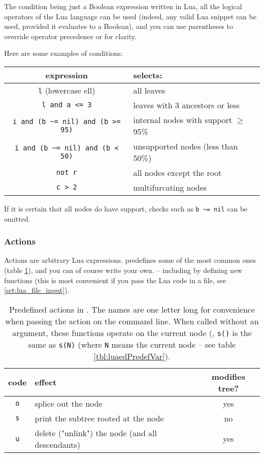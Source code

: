 The condition being just a Boolean expression written in Lua, all the logical
operators of the Lua language can be used (indeed, any valid Lua snippet can be
used, provided it evaluates to a Boolean), and you can use parentheses to
override operator precedence or for clarity.

\noindent{}Here are some examples of \luaed{} conditions:

\begin{center}
\begin{tabular}{cl}
expression & selects: \\
\hline
\texttt{l} (lowercase ell) & all leaves \\
\texttt{l and a <= 3} & leaves with 3 ancestors or less \\
\texttt{i and (b \~{ }= nil) and (b >= 95)} & internal nodes with support $\geq$ 95\% \\ 
\texttt{i and (b \~{ }= nil) and (b < 50)} & unsupported nodes (less than 50\%) \\
\texttt{not r} & all nodes except the root \\
\texttt{c > 2} & multifurcating nodes
\end{tabular}
\end{center}

\noindent{}If it is certain that all nodes do have support, checks such as
\verb+b ~= nil+ can be omitted.

\subsubsection{Actions}

Actions are arbitrary Lua expressions. \luaed{} predefines some of the most
common ones (table \ref{tbl:luaedPredefFunc}), and you can of course write
your own. -- including by defining new functions (this is most
convenient if you pass the Lua code in a file, see \ref{sct:lua_file_input}).

\begin{table}
	\centering
	\begin{tabular}{clc}
		code & effect & modifies tree?\\
		\hline
		\texttt{o}	& splice out the node 									& yes \\
		\texttt{s}	& print the subtree rooted at the node 	& no \\
		\texttt{u} 	& delete ("unlink") the node (and all descendants) & yes
	\end{tabular}
	\caption{%
		\label{tbl:luaedPredefFunc}
		Predefined actions in \luaed. The names are one letter long for convenience
		when passing the action on the command line. When called without an
		argument, these functions operate on the current node (\ie, \texttt{s()} is
		the same as \texttt{s(N)} (where \texttt{N} means the current node -- see
		table \ref{tbl:luaedPredefVar}).
	}
\end{table}

